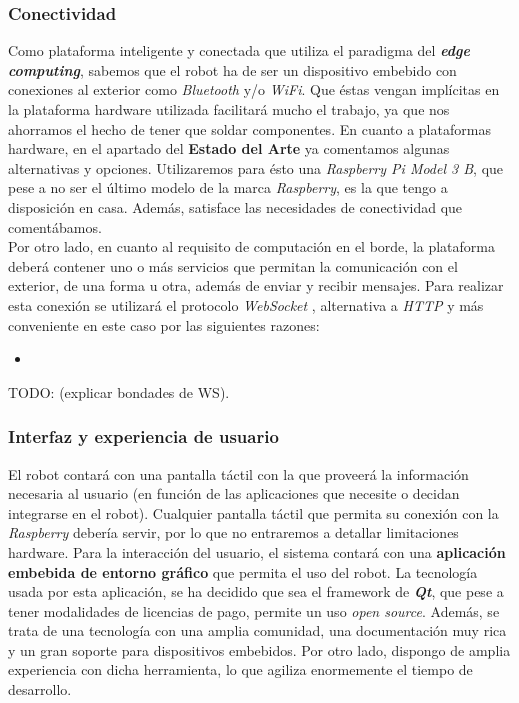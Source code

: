 \subsubsection{Conectividad}

Como plataforma inteligente y conectada que utiliza el paradigma del \textbf{\textit{edge computing}}, sabemos que el robot ha de ser un dispositivo embebido con conexiones al exterior como \textit{Bluetooth} y/o \textit{WiFi}. Que éstas vengan implícitas en la plataforma hardware utilizada facilitará mucho el trabajo, ya que nos ahorramos el hecho de tener que soldar componentes. En cuanto a plataformas hardware, en el apartado del \textbf{Estado del Arte} ya comentamos algunas alternativas y opciones. Utilizaremos para ésto una \textit{Raspberry Pi Model 3 B}, que pese a no ser el último modelo de la marca \textit{Raspberry}, es la que tengo a disposición en casa. Además, satisface las necesidades de conectividad que comentábamos.\\

Por otro lado, en cuanto al requisito de computación en el borde, la plataforma deberá contener uno o más servicios que permitan la comunicación con el exterior, de una forma u otra, además de enviar y recibir mensajes. Para realizar esta conexión se utilizará el protocolo \textit{WebSocket} \cite{ws_protocol}, alternativa a \textit{HTTP} \cite{http_protocol} y más conveniente en este caso por las siguientes razones:

\begin{itemize}
    \item 
\end{itemize}

TODO: (explicar bondades de WS). 

\subsubsection{Interfaz y experiencia de usuario}

El robot contará con una pantalla táctil con la que proveerá la información necesaria al usuario (en función de las aplicaciones que necesite o decidan integrarse en el robot). Cualquier pantalla táctil que permita su conexión con la \textit{Raspberry} debería servir, por lo que no entraremos a detallar limitaciones hardware. Para la interacción del usuario, el sistema contará con una \textbf{aplicación embebida de entorno gráfico} que permita el uso del robot. La tecnología usada por esta aplicación, se ha decidido que sea el framework de \textbf{\textit{Qt}}, que pese a tener modalidades de licencias de pago, permite un uso \textit{open source}. Además, se trata de una tecnología con una amplia comunidad, una documentación muy rica y un gran soporte para dispositivos embebidos. Por otro lado, dispongo de amplia experiencia con dicha herramienta, lo que agiliza enormemente el tiempo de desarrollo.\\


